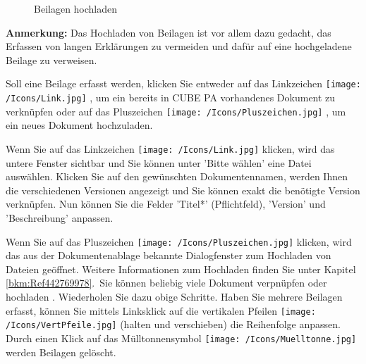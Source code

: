 \begin{figure}[H]
\caption{Beilagen hochladen}
\end{figure}

\textbf{Anmerkung:} Das Hochladen von Beilagen ist vor allem dazu gedacht, das Erfassen von langen Erklärungen zu vermeiden und dafür auf eine hochgeladene Beilage zu verweisen.

\vspace{\baselineskip}

Soll eine Beilage erfasst werden, klicken Sie entweder auf das Linkzeichen \texttt{[image: /Icons/Link.jpg]} , um ein bereits in CUBE PA vorhandenes Dokument zu verknüpfen oder auf das Pluszeichen \texttt{[image: /Icons/Pluszeichen.jpg]} , um ein neues Dokument hochzuladen. 

\vspace{\baselineskip}

Wenn Sie auf das Linkzeichen \texttt{[image: /Icons/Link.jpg]}  klicken, wird das untere Fenster sichtbar und Sie können unter 'Bitte wählen'  eine Datei auswählen. Klicken Sie auf den gewünschten Dokumentennamen, werden Ihnen die verschiedenen Versionen angezeigt und Sie können exakt die benötigte Version verknüpfen. Nun können Sie die Felder 'Titel*' (Pflichtfeld), 'Version' und 'Beschreibung'  anpassen.

\vspace{\baselineskip}

Wenn Sie auf das Pluszeichen \texttt{[image: /Icons/Pluszeichen.jpg]}  klicken, wird das aus der Dokumentenablage bekannte Dialogfenster zum Hochladen von Dateien geöffnet. Weitere Informationen zum Hochladen finden Sie unter Kapitel \ref{bkm:Ref442769978}.\
Sie können beliebig viele Dokument verpnüpfen  oder hochladen . Wiederholen Sie dazu obige Schritte. Haben Sie mehrere Beilagen erfasst, können Sie mittels Linksklick auf die vertikalen Pfeilen \texttt{[image: /Icons/VertPfeile.jpg]}  (halten und verschieben) die Reihenfolge anpassen. Durch einen Klick auf das Mülltonnensymbol \texttt{[image: /Icons/Muelltonne.jpg]}  werden Beilagen gelöscht.

